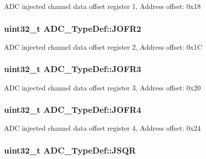 A\-D\-C injected channel data offset register 1, Address offset\-: 0x18 \hypertarget{struct_a_d_c___type_def_aa20f76044c11042dde41c1060853fb82}{
\subsubsection[{J\-O\-F\-R2}]{ uint32\-\_\-t A\-D\-C\-\_\-\-Type\-Def\-::\-J\-O\-F\-R2}}\label{struct_a_d_c___type_def_aa20f76044c11042dde41c1060853fb82}
A\-D\-C injected channel data offset register 2, Address offset\-: 0x1\-C \hypertarget{struct_a_d_c___type_def_ae9c78142f6edf8122384263878d09015}{
\subsubsection[{J\-O\-F\-R3}]{ uint32\-\_\-t A\-D\-C\-\_\-\-Type\-Def\-::\-J\-O\-F\-R3}}\label{struct_a_d_c___type_def_ae9c78142f6edf8122384263878d09015}
A\-D\-C injected channel data offset register 3, Address offset\-: 0x20 \hypertarget{struct_a_d_c___type_def_a92f5c1a5aaa8b286317f923482e09d35}{
\subsubsection[{J\-O\-F\-R4}]{ uint32\-\_\-t A\-D\-C\-\_\-\-Type\-Def\-::\-J\-O\-F\-R4}}\label{struct_a_d_c___type_def_a92f5c1a5aaa8b286317f923482e09d35}
A\-D\-C injected channel data offset register 4, Address offset\-: 0x24 \hypertarget{struct_a_d_c___type_def_a5438a76a93ac1bd2526e92ef298dc193}{
\subsubsection[{J\-S\-Q\-R}]{ uint32\-\_\-t A\-D\-C\-\_\-\-Type\-Def\-::\-J\-S\-Q\-R}}\label{struct_a_d_c___type_def_a5438a76a93ac1bd2526e92ef298dc193}
